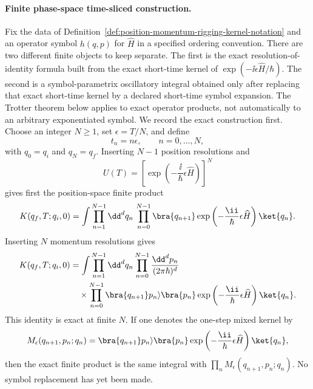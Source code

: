 \paragraph{Finite phase-space time-sliced construction.}
\label{par:finite-phase-space-time-sliced-kernel}
Fix the data of Definition~\ref{def:position-momentum-rigging-kernel-notation}
and an operator symbol \(h(q,p)\) for \(\widehat H\) in a specified ordering
convention.  There are two different finite objects to keep separate.  The
first is the exact resolution-of-identity formula built from the exact
short-time kernel of \(\exp(-\ii\epsilon\widehat H/\hbar)\).  The second is a
symbol-parametrix oscillatory integral obtained only after replacing that
exact short-time kernel by a declared short-time symbol expansion.  The
Trotter theorem below applies to exact operator products, not automatically to
an arbitrary exponentiated symbol.  We record the exact construction first.
Choose an integer \(N\ge1\), set \(\epsilon=T/N\), and define
\[
  t_n=n\epsilon,\qquad n=0,\ldots,N,
\]
with \(q_0=q_i\) and \(q_N=q_f\).  Inserting \(N-1\) position resolutions and
\[
  U(T)=\left[\exp\left(-\frac{\ii}{\hbar}\epsilon\widehat H\right)\right]^N
\]
gives first the position-space finite product
\[
  K(q_f,T;q_i,0)
  =
  \int\prod_{n=1}^{N-1}\dd^dq_n\,
  \prod_{n=0}^{N-1}
  \bra{q_{n+1}}
  \exp\left(-\frac{\ii}{\hbar}\epsilon\widehat H\right)
  \ket{q_n}.
\]
Inserting \(N\) momentum resolutions gives
\[
\begin{aligned}
  K(q_f,T;q_i,0)
  &=
  \int\prod_{n=1}^{N-1}\dd^dq_n
  \prod_{n=0}^{N-1}
  \frac{\dd^dp_n}{(2\pi\hbar)^d}
  \\
  &\quad\times
  \prod_{n=0}^{N-1}
  \bra{q_{n+1}}p_n\rangle
  \bra{p_n}\exp\left(-\frac{\ii}{\hbar}\epsilon\widehat H\right)\ket{q_n}.
\end{aligned}
\]
This identity is exact at finite \(N\).  If one denotes the one-step mixed
kernel by
\[
  M_\epsilon(q_{n+1},p_n;q_n)
  =
  \bra{q_{n+1}}p_n\rangle
  \bra{p_n}\exp\left(-\frac{\ii}{\hbar}\epsilon\widehat H\right)\ket{q_n},
\]
then the exact finite product is the same integral with
\(\prod_n M_\epsilon(q_{n+1},p_n;q_n)\).  No symbol replacement has yet been
made.

\begin{center}
\end{center}

